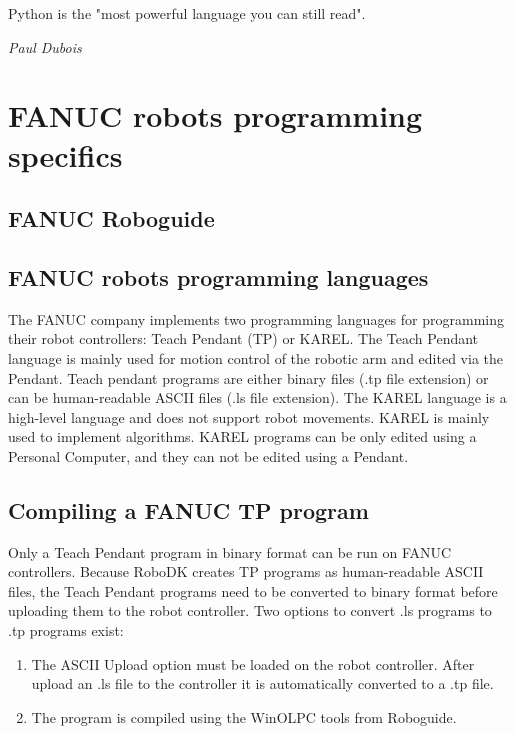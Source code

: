 \label{chap:implementation}

\epigraph{Python is the "most powerful language you can still read".}{\textit{Paul Dubois}}

\section{FANUC robots programming specifics}

\subsection{FANUC Roboguide}



\subsection{FANUC robots programming languages}

The FANUC company implements two programming languages for programming their robot controllers: Teach Pendant (TP) or KAREL. The Teach Pendant language is mainly used for motion control of the robotic arm and edited via the Pendant. Teach pendant programs are either binary files (.tp file extension) or can be human-readable ASCII files (.ls file extension). The KAREL language is a high-level language and does not support robot movements. KAREL is mainly used to implement algorithms. KAREL programs can be only edited using a Personal Computer, and they can not be edited using a Pendant.

\subsection{Compiling a FANUC TP program}

Only a Teach Pendant program in binary format can be run on FANUC controllers. Because RoboDK creates TP programs as human-readable ASCII files, the Teach Pendant programs need to be converted to binary format before uploading them to the robot controller. Two options to convert .ls programs to .tp programs exist:

\begin{enumerate}
\item The ASCII Upload option must be loaded on the robot controller. After upload an .ls file to the controller it is automatically converted to a .tp file.
\item The program is compiled using the WinOLPC tools from Roboguide. 
\end{enumerate}